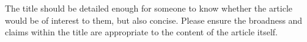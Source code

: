 \section{}
The title should be detailed enough for someone to know whether the article would be of interest to them, but also concise. Please ensure the broadness and claims within the title are appropriate to the content of the article itself.
